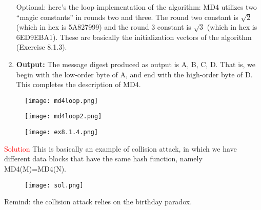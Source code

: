 \documentclass{article}
\begin{document}
\begin{enumerate}
    Optional: here's the loop implementation of the algorithm:
    \newline MD4 utilizes  two “magic constants”  in rounds  two and three. The round two constant is $\sqrt{2}$ (which in hex is 5A827999) and the round 3 constant is $\sqrt{3}$ (which in hex is 6ED9EBA1). These are basically the initialization vectors of the algorithm (Exercise 8.1.3).
    \item \textbf{Output:} The message digest  produced as output is A, B, C, D. That is, we begin with the low-order byte of A, and  end with the high-order byte of D. This completes the description of MD4.
\end{enumerate}
\begin{figure} [H]
    \centering
    \texttt{[image: md4loop.png]}
\end{figure}
\begin{figure} [H]
    \centering
    \texttt{[image: md4loop2.png]}
\end{figure}

\begin{figure} [H]
    \centering
    \texttt{[image: ex8.1.4.png]}
\end{figure}
\newline\newline\textcolor{red}{Solution}
\newline This is basically an example of collision attack, in which we have different data blocks that have the same hash function, namely MD4(M)=MD4(N).
\begin{figure} [H]
    \centering
    \texttt{[image: sol.png]}
\end{figure}
Remind: the collision attack relies on the birthday paradox.
\end{document}
